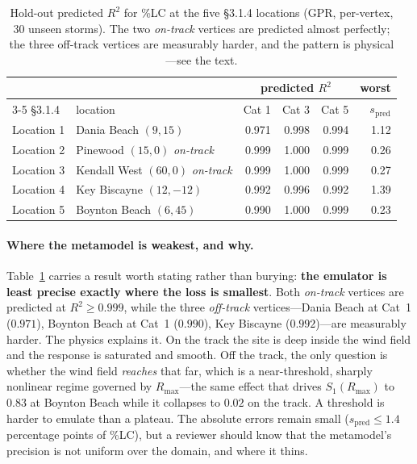 \documentclass[11pt]{article}
\begin{document}
\begin{table}[H]
\centering\footnotesize
\caption{Hold-out predicted $R^2$ for \%LC at the five §3.1.4 locations (GPR, per-vertex,
$30$ unseen storms). The two \emph{on-track} vertices are predicted almost perfectly;
the three off-track vertices are measurably harder, and the pattern is physical---see
the text.}
\label{tab:holdoutpts}
\begin{tabular}{llrrrr}
\toprule
 & & \multicolumn{3}{c}{predicted $R^2$} & worst\\
\cmidrule(lr){3-5}
§3.1.4 & location & Cat 1 & Cat 3 & Cat 5 & $s_{\text{pred}}$\\
\midrule
Location 1 & Dania Beach $(9,15)$        & 0.971 & 0.998 & 0.994 & 1.12\\
Location 2 & Pinewood $(15,0)$ \emph{on-track}      & 0.999 & 1.000 & 0.999 & 0.26\\
Location 3 & Kendall West $(60,0)$ \emph{on-track}  & 0.999 & 1.000 & 0.999 & 0.27\\
Location 4 & Key Biscayne $(12,-12)$     & 0.992 & 0.996 & 0.992 & 1.39\\
Location 5 & Boynton Beach $(6,45)$      & 0.990 & 1.000 & 0.999 & 0.23\\
\bottomrule
\end{tabular}
\end{table}

\paragraph{Where the metamodel is weakest, and why.} Table~\ref{tab:holdoutpts} carries
a result worth stating rather than burying: \textbf{the emulator is least precise
exactly where the loss is smallest}. Both \emph{on-track} vertices are predicted at
$R^2\ge0.999$, while the three \emph{off-track} vertices---Dania Beach at Cat~1
($0.971$), Boynton Beach at Cat~1 ($0.990$), Key Biscayne ($0.992$)---are measurably
harder. The physics explains it. On the track the site is deep inside the wind field
and the response is saturated and smooth. Off the track, the only question is whether
the wind field \emph{reaches} that far, which is a near-threshold, sharply nonlinear
regime governed by $R_{\max}$---the same effect that drives $S_1(R_{\max})$ to $0.83$ at
Boynton Beach while it collapses to $0.02$ on the track. A threshold is harder to
emulate than a plateau. The absolute errors remain small ($s_{\text{pred}}\le1.4$
percentage points of \%LC), but a reviewer should know that the metamodel's precision
is not uniform over the domain, and where it thins.
\end{document}
